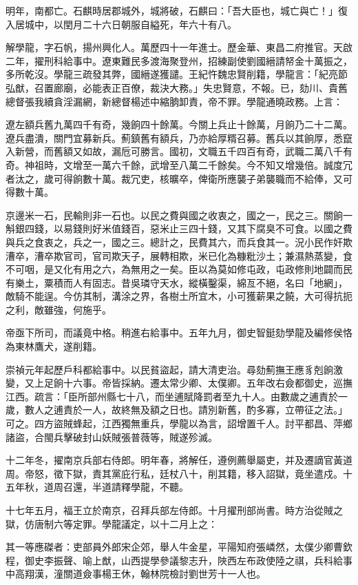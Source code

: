 \begin{pinyinscope}
明年，南都亡。石麒時居郡城外，城將破，石麒曰：「吾大臣也，城亡與亡！」復入居城中，以閏月二十六日朝服自縊死，年六十有八。

解學龍，字石帆，揚州興化人。萬歷四十一年進士。歷金華、東昌二府推官。天啟二年，擢刑科給事中。遼東難民多渡海聚登州，招練副使劉國縉請帑金十萬振之，多所乾沒。學龍三疏發其弊，國縉遂獲譴。王紀忤魏忠賢削籍，學龍言：「紀亮節弘猷，召置廊廟，必能表正百僚，裁決大務。」失忠賢意，不報。已，劾川、貴舊總督張我續貪淫漏網，新總督楊述中縮朒卸責，帝不罪。學龍通曉政務。上言：

遼左額兵舊九萬四千有奇，幾餉四十餘萬。今關上兵止十餘萬，月餉乃二十二萬。遼兵盡潰，關門宜募新兵。薊鎮舊有額兵，乃亦給厚糈召募。舊兵以其餉厚，悉竄入新營，而舊額又如故，漏卮可勝言。國初，文職五千四百有奇，武職二萬八千有奇。神祖時，文增至一萬六千餘，武增至八萬二千餘矣。今不知又增幾倍。誠度冗者汰之，歲可得餉數十萬。裁冗吏，核曠卒，俾衛所應襲子弟襲職而不給俸，又可得數十萬。

京邊米一石，民輸則非一石也。以民之費與國之收衷之，國之一，民之三。關餉一斛銀四錢，以易錢則好米值錢百，惡米止三四十錢，又其下腐臭不可食。以國之費與兵之食衷之，兵之一，國之三。總計之，民費其六，而兵食其一。況小民作奸欺漕卒，漕卒欺官司，官司欺天子，展轉相欺，米已化為糠粃沙土；兼濕熱蒸變，食不可咽，是又化有用之六，為無用之一矣。臣以為莫如修屯政，屯政修則地闢而民有樂土，粟積而人有固志。昔吳璘守天水，縱橫鑿渠，綿亙不絕，名曰「地網」，敵騎不能逞。今仿其制，溝涂之界，各樹土所宜木，小可獲薪果之饒，大可得抗扼之利，敵雖強，何施乎。

帝亟下所司，而議竟中格。稍進右給事中。五年九月，御史智鋌劾學龍及編修侯恪為東林鷹犬，遂削籍。

崇禎元年起歷戶科都給事中。以民貧盜起，請大清吏治。尋劾薊撫王應豸剋餉激變，又上足餉十六事。帝皆採納。遷太常少卿、太僕卿。五年改右僉都御史，巡撫江西。疏言：「臣所部州縣七十八，而坐逋賦降罰者至九十人。由數歲之逋責於一歲，數人之逋責於一人，故終無及額之日也。請別新舊，酌多寡，立帶征之法。」可之。四方盜賊蜂起，江西獨無重兵，學龍以為言，詔增置千人。討平都昌、萍鄉諸盜，合閩兵擊破封山妖賊張普薇等，賊遂殄滅。

十二年冬，擢南京兵部右侍郎。明年春，將解任，遵例薦舉屬吏，并及遷謫官黃道周。帝怒，徵下獄，責其黨庇行私，廷杖八十，削其籍，移入詔獄，竟坐遣戍。十五年秋，道周召還，半道請釋學龍，不聽。

十七年五月，福王立於南京，召拜兵部左侍郎。十月擢刑部尚書。時方治從賊之獄，仿唐制六等定罪。學龍議定，以十二月上之：

其一等應磔者：吏部員外郎宋企郊，舉人牛金星，平陽知府張嶙然，太僕少卿曹欽程，御史李振聲、喻上猷，山西提學參議黎志升，陜西左布政使陸之祺，兵科給事中高翔漢，潼關道僉事楊王休，翰林院檢討劉世芳十一人也。


\end{pinyinscope}
